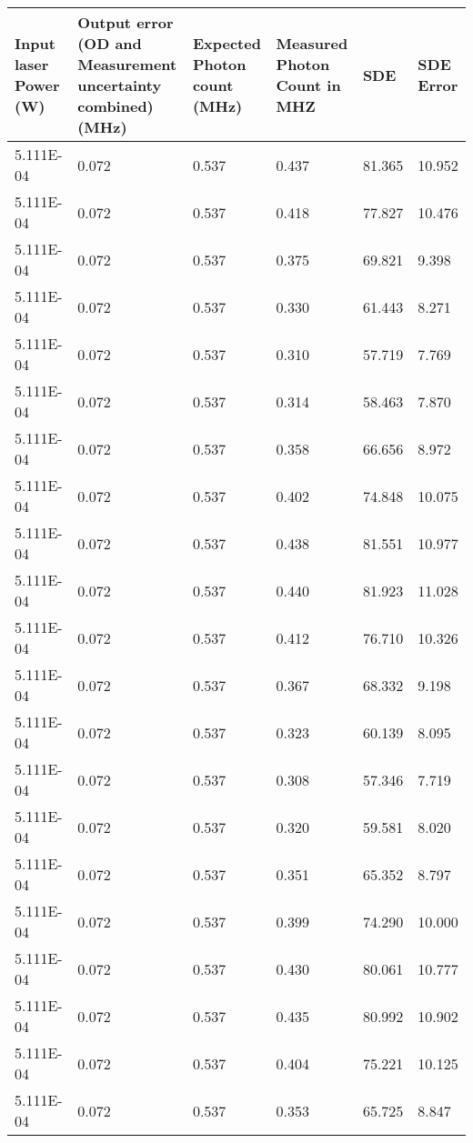 \begin{table}[!ht]
    \centering
    \begin{tabular}{|l|l|l|l|l|l|}
    \hline
        Input laser Power (W) & Output error (OD and Measurement uncertainty combined) (MHz) & Expected Photon count (MHz) & Measured Photon Count in MHZ & SDE  & SDE Error  \\ \hline
        5.111E-04 & 0.072 & 0.537 & 0.437 & 81.365 & 10.952 \\ \hline
        5.111E-04 & 0.072 & 0.537 & 0.418 & 77.827 & 10.476 \\ \hline
        5.111E-04 & 0.072 & 0.537 & 0.375 & 69.821 & 9.398 \\ \hline
        5.111E-04 & 0.072 & 0.537 & 0.330 & 61.443 & 8.271 \\ \hline
        5.111E-04 & 0.072 & 0.537 & 0.310 & 57.719 & 7.769 \\ \hline
        5.111E-04 & 0.072 & 0.537 & 0.314 & 58.463 & 7.870 \\ \hline
        5.111E-04 & 0.072 & 0.537 & 0.358 & 66.656 & 8.972 \\ \hline
        5.111E-04 & 0.072 & 0.537 & 0.402 & 74.848 & 10.075 \\ \hline
        5.111E-04 & 0.072 & 0.537 & 0.438 & 81.551 & 10.977 \\ \hline
        5.111E-04 & 0.072 & 0.537 & 0.440 & 81.923 & 11.028 \\ \hline
        5.111E-04 & 0.072 & 0.537 & 0.412 & 76.710 & 10.326 \\ \hline
        5.111E-04 & 0.072 & 0.537 & 0.367 & 68.332 & 9.198 \\ \hline
        5.111E-04 & 0.072 & 0.537 & 0.323 & 60.139 & 8.095 \\ \hline
        5.111E-04 & 0.072 & 0.537 & 0.308 & 57.346 & 7.719 \\ \hline
        5.111E-04 & 0.072 & 0.537 & 0.320 & 59.581 & 8.020 \\ \hline
        5.111E-04 & 0.072 & 0.537 & 0.351 & 65.352 & 8.797 \\ \hline
        5.111E-04 & 0.072 & 0.537 & 0.399 & 74.290 & 10.000 \\ \hline
        5.111E-04 & 0.072 & 0.537 & 0.430 & 80.061 & 10.777 \\ \hline
        5.111E-04 & 0.072 & 0.537 & 0.435 & 80.992 & 10.902 \\ \hline
        5.111E-04 & 0.072 & 0.537 & 0.404 & 75.221 & 10.125 \\ \hline
        5.111E-04 & 0.072 & 0.537 & 0.353 & 65.725 & 8.847 \\ \hline
    \end{tabular}
\end{table}